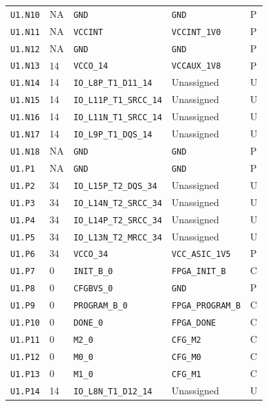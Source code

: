 \documentclass[11pt,a4paper]{article}
\begin{document}
\begin{longtable}{@{}P{20mm}P{10mm}P{75mm}P{49mm}P{7mm}@{}}
\nolinkurl{U1.N10} & NA & \nolinkurl{GND} & \nolinkurl{GND} & P \\
\nolinkurl{U1.N11} & NA & \nolinkurl{VCCINT} & \nolinkurl{VCCINT_1V0} & P \\
\nolinkurl{U1.N12} & NA & \nolinkurl{GND} & \nolinkurl{GND} & P \\
\nolinkurl{U1.N13} & 14 & \nolinkurl{VCCO_14} & \nolinkurl{VCCAUX_1V8} & P \\
\nolinkurl{U1.N14} & 14 & \nolinkurl{IO_L8P_T1_D11_14} & Unassigned & U \\
\nolinkurl{U1.N15} & 14 & \nolinkurl{IO_L11P_T1_SRCC_14} & Unassigned & U \\
\nolinkurl{U1.N16} & 14 & \nolinkurl{IO_L11N_T1_SRCC_14} & Unassigned & U \\
\nolinkurl{U1.N17} & 14 & \nolinkurl{IO_L9P_T1_DQS_14} & Unassigned & U \\
\nolinkurl{U1.N18} & NA & \nolinkurl{GND} & \nolinkurl{GND} & P \\
\nolinkurl{U1.P1} & NA & \nolinkurl{GND} & \nolinkurl{GND} & P \\
\nolinkurl{U1.P2} & 34 & \nolinkurl{IO_L15P_T2_DQS_34} & Unassigned & U \\
\nolinkurl{U1.P3} & 34 & \nolinkurl{IO_L14N_T2_SRCC_34} & Unassigned & U \\
\nolinkurl{U1.P4} & 34 & \nolinkurl{IO_L14P_T2_SRCC_34} & Unassigned & U \\
\nolinkurl{U1.P5} & 34 & \nolinkurl{IO_L13N_T2_MRCC_34} & Unassigned & U \\
\nolinkurl{U1.P6} & 34 & \nolinkurl{VCCO_34} & \nolinkurl{VCC_ASIC_1V5} & P \\
\nolinkurl{U1.P7} & 0 & \nolinkurl{INIT_B_0} & \nolinkurl{FPGA_INIT_B} & C \\
\nolinkurl{U1.P8} & 0 & \nolinkurl{CFGBVS_0} & \nolinkurl{GND} & P \\
\nolinkurl{U1.P9} & 0 & \nolinkurl{PROGRAM_B_0} & \nolinkurl{FPGA_PROGRAM_B} & C \\
\nolinkurl{U1.P10} & 0 & \nolinkurl{DONE_0} & \nolinkurl{FPGA_DONE} & C \\
\nolinkurl{U1.P11} & 0 & \nolinkurl{M2_0} & \nolinkurl{CFG_M2} & C \\
\nolinkurl{U1.P12} & 0 & \nolinkurl{M0_0} & \nolinkurl{CFG_M0} & C \\
\nolinkurl{U1.P13} & 0 & \nolinkurl{M1_0} & \nolinkurl{CFG_M1} & C \\
\nolinkurl{U1.P14} & 14 & \nolinkurl{IO_L8N_T1_D12_14} & Unassigned & U \\

\end{longtable}
\end{document}
